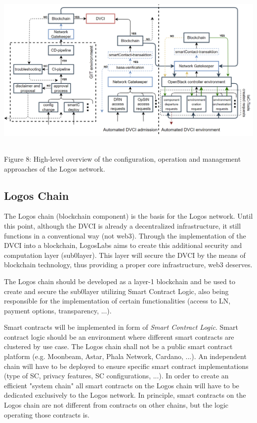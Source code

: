 \documentclass[]{article}
\begin{document}
\begin{center}
	\includegraphics[height=8cm]{configuration-operation-management-approach}
\end{center}
\begin{center}
	Figure 8: High-level overview of the configuration, operation and management approaches of the Logos network.
\end{center}

\subsection{Logos Chain}
The Logos chain (blockchain component) is the basis for the Logos network. 
Until this point, although the DVCI is already a decentralized infrastructure, it still functions in a conventional way (not web3).
Through the implementation of the DVCI into a blockchain, LogosLabs aims to create this additional security and computation layer (sub0layer). 
This layer will secure the DVCI by the means of blockchain technology, thus providing a proper core infrastructure, web3 deserves.

The Logos chain should be developed as a layer-1 blockchain and be used to create and secure the sub0layer utilizing Smart Contract Logic, also being responsible for the implementation of certain functionalities (access to LN, payment options, transparency, ...).

Smart contracts will be implemented in form of \textit{Smart Contract Logic}.
Smart contract logic should be an environment where different smart contracts are clustered by use case.
The Logos chain shall not be a public smart contract platform (e.g. Moonbeam, Astar, Phala Network, Cardano, ...).
An independent chain will have to be deployed to ensure specific smart contract implementations (type of SC, privacy features, SC configurations, ...). 
In order to create an efficient "system chain" all smart contracts on the Logos chain will have to be dedicated exclusively to the Logos network.
In principle, smart contracts on the Logos chain are not different from contracts on other chains, but the logic operating those contracts is.
\end{document}

